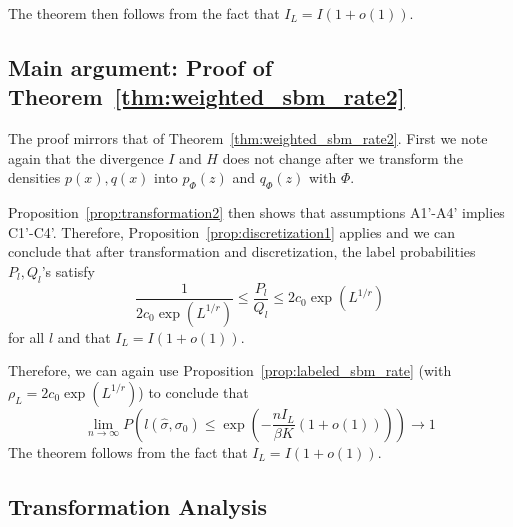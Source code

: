 The theorem then follows from the fact that $I_L = I(1+o(1))$. 

\subsection{Main argument: Proof of Theorem~\ref{thm:weighted_sbm_rate2}}
\label{AppThmRate2}

The proof mirrors that of Theorem~\ref{thm:weighted_sbm_rate2}. First we note again that the divergence $I$ and $H$ does not change after we transform the densities $p(x), q(x)$ into $p_{\Phi}(z)$ and $q_{\Phi}(z)$ with $\Phi$.

Proposition~\ref{prop:transformation2} then shows that assumptions A1'-A4' implies C1'-C4'. Therefore, Proposition~\ref{prop:discretization1} applies and we can conclude that after transformation and discretization, the label probabilities $P_l, Q_l$'s satisfy 
\[
\frac{1}{2c_0 \exp(L^{1/r})} \leq \frac{P_l}{Q_l} \leq 2c_0 \exp(L^{1/r})
\]
for all $l$ and that $I_L = I(1+o(1))$.

Therefore, we can again use Proposition~\ref{prop:labeled_sbm_rate} (with $\rho_L = 2 c_0 \exp(L^{1/r})$) to conclude that
\[
\lim_{n \rightarrow \infty} P \left( l(\hat{\sigma}, \sigma_0) \leq \exp \left( - \frac{ n I_L}{ \beta K} (1 + o(1)) \right) \right) \rightarrow 1
\]
The theorem follows from the fact that $I_L = I(1+o(1))$. 

\subsection{Transformation Analysis}

